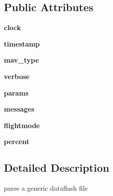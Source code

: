\subsection*{Public Attributes}
\begin{DoxyCompactItemize}
\item 
\mbox{\label{classpymavlink_1_1DFReader_1_1DFReader_acd84fa97df078e2f2bc16e06904f73a0}} 
{\bfseries clock}
\item 
\mbox{\label{classpymavlink_1_1DFReader_1_1DFReader_a736be07c12524b4c6cae6225e458e812}} 
{\bfseries timestamp}
\item 
\mbox{\label{classpymavlink_1_1DFReader_1_1DFReader_a7f27c207bdc7b62333579d81bd92219b}} 
{\bfseries mav\+\_\+type}
\item 
\mbox{\label{classpymavlink_1_1DFReader_1_1DFReader_abbad566e5d37a3d4582cbb7283a53feb}} 
{\bfseries verbose}
\item 
\mbox{\label{classpymavlink_1_1DFReader_1_1DFReader_ab98bf6cb7dba82b6cad031b3676af9d6}} 
{\bfseries params}
\item 
\mbox{\label{classpymavlink_1_1DFReader_1_1DFReader_a018083ea80aeb982d2f3bcb8fe8a4957}} 
{\bfseries messages}
\item 
\mbox{\label{classpymavlink_1_1DFReader_1_1DFReader_af8c453df7a4226b12ee451a6742af34e}} 
{\bfseries flightmode}
\item 
\mbox{\label{classpymavlink_1_1DFReader_1_1DFReader_a716dfb53a8ff2c2af70ce668998b1faa}} 
{\bfseries percent}
\end{DoxyCompactItemize}


\subsection{Detailed Description}
\begin{DoxyVerb}parse a generic dataflash file\end{DoxyVerb}
 

